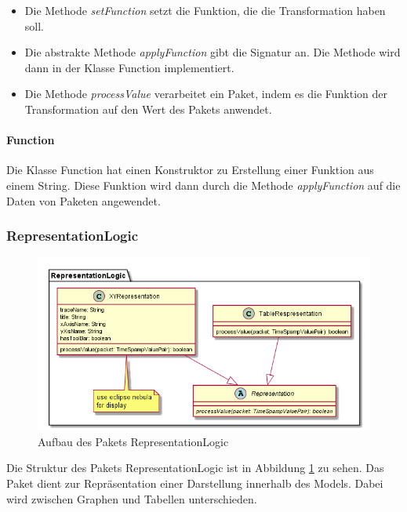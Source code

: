 \documentclass[parskip=full]{scrartcl}
\begin{document}
\begin{itemize}

\item Die Methode \textit{setFunction} setzt die Funktion, die die Transformation haben soll.
\item Die abstrakte Methode \textit{applyFunction} gibt die Signatur an. Die Methode wird dann in der Klasse Function implementiert.
\item Die Methode \textit{processValue} verarbeitet ein Paket, indem es die Funktion der Transformation auf den Wert des Pakets anwendet.


\end{itemize}

\paragraph{Function}

Die Klasse Function hat einen Konstruktor zu Erstellung einer Funktion aus einem String. Diese Funktion wird dann durch die Methode \textit{applyFunction} auf die Daten von Paketen angewendet.





\subsubsection{RepresentationLogic}
\begin{figure}[htbp]
	\begin{center}
		\includegraphics[width = 12cm]{Grafiken/RepresentationLogic.png}
		\caption{Aufbau des Pakets RepresentationLogic}
		\label{RepresentationLogic}
	\end{center}
\end{figure}
Die Struktur des Pakets RepresentationLogic ist in Abbildung \ref{RepresentationLogic} zu sehen. Das Paket dient zur Repräsentation einer Darstellung innerhalb des Models. Dabei wird zwischen Graphen und Tabellen unterschieden.
\end{document}
